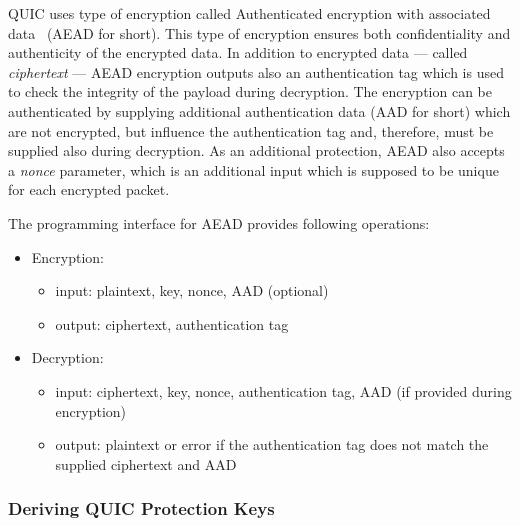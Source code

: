 QUIC uses type of encryption called Authenticated encryption with associated data~\cite{rfc5116}
(AEAD for short). This type of encryption ensures both confidentiality and authenticity of the
encrypted data. In addition to encrypted data --- called \textit{ciphertext} --- AEAD encryption
outputs also an authentication tag which is used to check the integrity of the payload during
decryption. The encryption can be authenticated by supplying additional authentication data (AAD for
short) which are not encrypted, but influence the authentication tag and, therefore, must be
supplied also during decryption. As an additional protection, AEAD also accepts a \textit{nonce}
parameter, which is an additional input which is supposed to be unique for each encrypted packet.

The programming interface for AEAD provides following operations:

\begin{itemize}

  \item Encryption:

  \begin{itemize}

    \item input: plaintext, key, nonce, AAD (optional)

    \item output: ciphertext, authentication tag

  \end{itemize}

  \item Decryption:

  \begin{itemize}

    \item input: ciphertext, key, nonce, authentication tag, AAD (if provided during encryption)

    \item output: plaintext or error if the authentication tag does not match the supplied
      ciphertext and AAD

  \end{itemize}

\end{itemize}

\subsubsection{Deriving QUIC Protection Keys}\label{sec:02-encryption-key-derivation}

